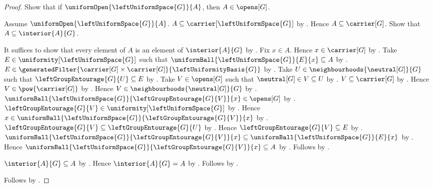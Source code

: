 \begin{proof}
    Show that if $\uniformOpen{\leftUniformSpace{G}}{A}$, then
        $A\in\opens[G]$.
    \begin{subproof}
        Assume $\uniformOpen{\leftUniformSpace{G}}{A}$.
        $A\subseteq\carrier[\leftUniformSpace{G}]$
            by .
        Hence $A\subseteq\carrier[G]$.
        Show that $A\subseteq\interior{A}{G}$.
        \begin{subproof}
            It suffices to show that every element of $A$ is an element of
                $\interior{A}{G}$ by .
            Fix $x\in A$.
            Hence $x\in\carrier[G]$ by .
            Take $E\in\uniformity[\leftUniformSpace{G}]$ such that
                $\uniformBall{\leftUniformSpace{G}}{E}{x}\subseteq A$
                by .
            $E\in\generatedFilter
                {\carrier[G]\times\carrier[G]}{\leftUniformityBasis{G}}$
                by .
            Take $U\in\neighbourhoods{\neutral[G]}{G}$ such that
                $\leftGroupEntourage{G}{U}\subseteq E$
                by .
            Take $V\in\opens[G]$ such that
                $\neutral[G]\in V\subseteq U$ by .
            $V\subseteq\carrier[G]$ by .
            Hence $V\in\pow{\carrier[G]}$ by .
            Hence $V\in\neighbourhoods{\neutral[G]}{G}$
                by .
            $\uniformBall{\leftUniformSpace{G}}
                {\leftGroupEntourage{G}{V}}{x}\in\opens[G]$
                by .
            $\leftGroupEntourage{G}{V}
                \in\uniformity[\leftUniformSpace{G}]$
                by .
            Hence $x\in\uniformBall{\leftUniformSpace{G}}
                {\leftGroupEntourage{G}{V}}{x}$
                by .
            $\leftGroupEntourage{G}{V}
                \subseteq\leftGroupEntourage{G}{U}$
                by .
            Hence $\leftGroupEntourage{G}{V}\subseteq E$
                by .
            $\uniformBall{\leftUniformSpace{G}}
                    {\leftGroupEntourage{G}{V}}{x}
                \subseteq\uniformBall{\leftUniformSpace{G}}{E}{x}$
                by .
            Hence $\uniformBall{\leftUniformSpace{G}}
                {\leftGroupEntourage{G}{V}}{x}\subseteq A$
                by .
            Follows by .
        \end{subproof}
        $\interior{A}{G}\subseteq A$ by .
        Hence $\interior{A}{G}=A$ by .
        Follows by .
    \end{subproof}
    Follows by \auto.
\end{proof}

